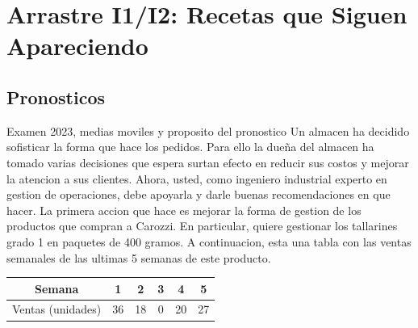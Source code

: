 \section{Arrastre I1/I2: Recetas que Siguen Apareciendo}

\subsection{Pronosticos}

\begin{enunciado}{Examen 2023, medias moviles y proposito del pronostico}
Un almacen ha decidido sofisticar la forma que hace los pedidos. Para ello la dueña del almacen ha tomado varias decisiones que espera surtan efecto en reducir sus costos y mejorar la atencion a sus clientes. Ahora, usted, como ingeniero industrial experto en gestion de operaciones, debe apoyarla y darle buenas recomendaciones en que hacer. La primera accion que hace es mejorar la forma de gestion de los productos que compran a Carozzi. En particular, quiere gestionar los tallarines grado 1 en paquetes de 400 gramos. A continuacion, esta una tabla con las ventas semanales de las ultimas 5 semanas de este producto.

\begin{center}
\begin{tabular}{c|ccccc}
\toprule
Semana & 1 & 2 & 3 & 4 & 5\\
\midrule
Ventas (unidades) & 36 & 18 & 0 & 20 & 27\\
\bottomrule
\end{tabular}
\end{center}


\end{enunciado}
